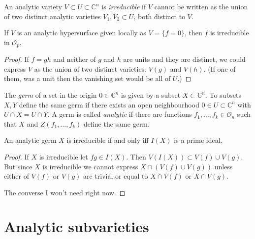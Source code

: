 \begin{definition}
\label{definition-irreducible-variety}
An analytic variety $V\subset U\subset \mathbb{C}^n$ is {\it irreducible} if
$V$ cannot be written as the union of two distinct analytic varieties 
$V_1,V_2\subset U$, both distinct to $V$.
\end{definition}

\begin{lemma}
\label{lemma-irreducible-analytic-hypersurface-irreducible-polynomial}
If $V$ is an analytic hypersurface given locally as $V=\{f=0\}$, then $f$ is
irreducible in $\mathcal{O}_p$.
\end{lemma}

\begin{proof}
If $f=gh$ and neither of $g$ and $h$ are units and they are distinct, we could 
express $V$ as the union of two distinct varieties: $V(g)$ and $V(h)$. (If one 
of them, was a unit then the vanishing set would be all of $U$.)
\end{proof}

\begin{definition}
\label{definition-germ-of-set}
\begin{reference}
\cite[Definition 1.1.21]{huc}
\end{reference}
The {\it germ} of a set in the origin $0\in \mathbb{C}^n$ is given by a subset
$X \subset \mathbb{C}^n$. To subsets $X,Y$ define the same germ if there exists
an open neighbourhood $0 \in U\subset \mathbb{C}^n$ with $U\cap X=U\cap Y$. A
germ is called {\it analytic} if there are functions $f_1,\ldots,f_k\in
\mathcal{O}_n$ such that $X$ and $Z(f_1,\ldots,f_k)$ define the same germ.
\end{definition}

\begin{lemma}
\label{lemma-analytic-germ-is-irreducible-iff-prime-ideal}
\cite[Lemma 1.1.28]{huc}
An analytic germ $X$ is irreducible if and only iff $I(X)$ is a prime ideal.
\end{lemma}

\begin{proof}
If $X$ is irreducible let $fg\in I(X)$. Then $V(I(X))\subset V(f)\cup V(g)$. But
since $X$ is irreducible we cannot express $X \cap (V(f) \cup  V(g))$ unless
either of $V(f)$ or $V(g)$ are trivial or equal to $X \cap V(f)$ or $X \cap
V(g)$.

The converse I won't need right now.
\end{proof}

\section{Analytic subvarieties}
\label{section-analytic-subvarieties}

